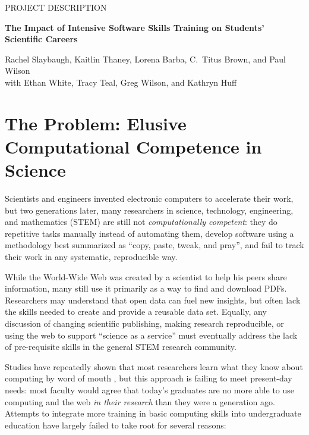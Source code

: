 \documentclass{proposalnsf}
\newlength{\up}
\begin{document}
\newpage

\pagestyle{plain}
\renewcommand{\thepage} {\arabic{page}}

\begin{center}
\small{PROJECT DESCRIPTION}


\large\textbf{The Impact of Intensive Software Skills Training on Students' Scientific Careers}

{\large \sf Rachel Slaybaugh, Kaitlin Thaney, Lorena Barba, C.\ Titus Brown, and Paul Wilson\\ 
  with Ethan White, Tracy Teal, Greg Wilson, and Kathryn Huff}

\end{center}

\section{The Problem: Elusive Computational Competence in Science}

Scientists and engineers invented electronic computers to accelerate
their work, but two generations later, many researchers in science,
technology, engineering, and mathematics (STEM) are still not
\emph{computationally competent}: they do repetitive tasks manually
instead of automating them, develop software using a methodology best
summarized as ``copy, paste, tweak, and pray'', and fail to track
their work in any systematic, reproducible way.

While the World-Wide Web was created by a scientist to help his
peers share information, many still use it primarily as a way to find
and download PDFs.  Researchers may understand that open data can fuel
new insights, but often lack the skills needed to create and provide a
reusable data set.  Equally, any discussion of changing scientific
publishing, making research reproducible, or using the web to support
``science as a service'' must eventually address the lack of
pre-requisite skills in the general STEM research community.

Studies have repeatedly shown that most researchers learn what they
know about computing by word of mouth \cite{hannay2009}, but this
approach is failing to meet present-day needs: most faculty would
agree that today's graduates are no more able to use computing and the
web \emph{in their research} than they were a generation ago.
Attempts to integrate more training in basic computing skills into
undergraduate education have largely failed to take root for several
reasons:
\end{document}
